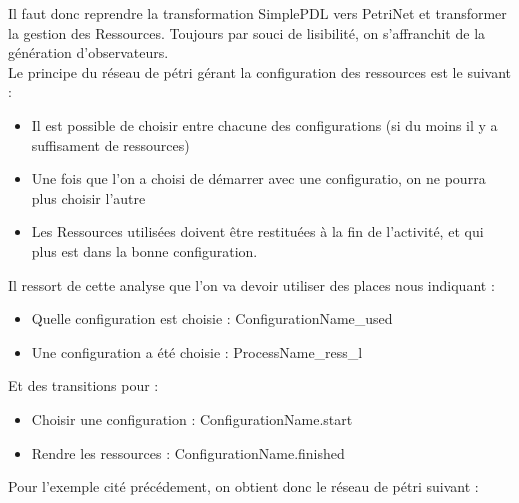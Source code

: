 Il faut donc reprendre la transformation SimplePDL vers PetriNet et transformer la gestion des Ressources. Toujours par souci de lisibilité, on s'affranchit de la génération d'observateurs.\\

Le principe du réseau de pétri gérant la configuration des ressources est le suivant :\\

\begin{itemize}
\item Il est possible de choisir entre chacune des configurations (si du moins il y a suffisament de ressources)
\item Une fois que l'on a choisi de démarrer avec une configuratio, on ne pourra plus choisir l'autre
\item Les Ressources utilisées doivent être restituées à la fin de l'activité, et qui plus est dans la bonne configuration.
\end{itemize}

Il ressort de cette analyse que l'on va devoir utiliser des places nous indiquant :\\

\begin{itemize}
\item Quelle configuration est choisie : ConfigurationName\_used
\item Une configuration a été choisie : ProcessName\_ress\_l\\
\end{itemize}

Et des transitions pour :\\

\begin{itemize}
\item Choisir une configuration : ConfigurationName.start
\item Rendre les ressources : ConfigurationName.finished\\
\end{itemize}

Pour l'exemple cité précédement, on obtient donc le réseau de pétri suivant :\\

